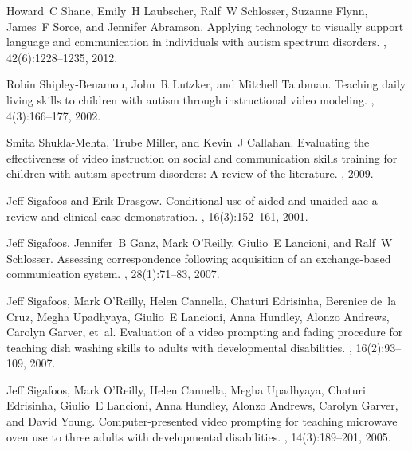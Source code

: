 \documentclass{ut-thesis}
\begin{document}
\begin{thebibliography}{100}
Howard~C Shane, Emily~H Laubscher, Ralf~W Schlosser, Suzanne Flynn, James~F
  Sorce, and Jennifer Abramson.
\newblock Applying technology to visually support language and communication in
  individuals with autism spectrum disorders.
,
  42(6):1228--1235, 2012.

Robin Shipley-Benamou, John~R Lutzker, and Mitchell Taubman.
\newblock Teaching daily living skills to children with autism through
  instructional video modeling.
, 4(3):166--177,
  2002.

Smita Shukla-Mehta, Trube Miller, and Kevin~J Callahan.
\newblock Evaluating the effectiveness of video instruction on social and
  communication skills training for children with autism spectrum disorders: A
  review of the literature.
, 2009.

Jeff Sigafoos and Erik Drasgow.
\newblock Conditional use of aided and unaided aac a review and clinical case
  demonstration.
,
  16(3):152--161, 2001.

Jeff Sigafoos, Jennifer~B Ganz, Mark O’Reilly, Giulio~E Lancioni, and Ralf~W
  Schlosser.
\newblock Assessing correspondence following acquisition of an exchange-based
  communication system.
, 28(1):71--83, 2007.

Jeff Sigafoos, Mark O’Reilly, Helen Cannella, Chaturi Edrisinha, Berenice
  de~la Cruz, Megha Upadhyaya, Giulio~E Lancioni, Anna Hundley, Alonzo Andrews,
  Carolyn Garver, et~al.
\newblock Evaluation of a video prompting and fading procedure for teaching
  dish washing skills to adults with developmental disabilities.
, 16(2):93--109, 2007.

Jeff Sigafoos, Mark O’Reilly, Helen Cannella, Megha Upadhyaya, Chaturi
  Edrisinha, Giulio~E Lancioni, Anna Hundley, Alonzo Andrews, Carolyn Garver,
  and David Young.
\newblock Computer-presented video prompting for teaching microwave oven use to
  three adults with developmental disabilities.
, 14(3):189--201, 2005.


\end{thebibliography}
\end{document}
